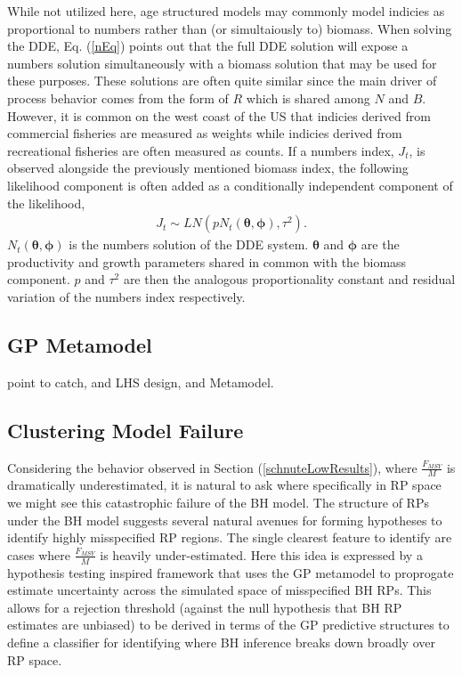 %
While not utilized here, age structured models may commonly model
indicies as proportional to numbers rather than (or simultaiously to)
biomass. When solving the DDE, Eq. (\ref{nEq}) points out that the full DDE
solution will expose a numbers solution simultaneously with a biomass solution
that may be used for these purposes. These solutions are often quite similar
since the main driver of process behavior comes from the form of $R$ which is
shared among $N$ and $B$.
However, it is common on the west coast of the US that indicies derived from commercial
fisheries are measured as weights %
while indicies derived from recreational fisheries are often measured as counts.
If a numbers index, $J_t$, is observed alongside the previously
mentioned biomass index, the following likelihood component is often added as a
conditionally independent component of the likelihood, %
\begin{align}
J_t \sim LN(p N_t(\bm{\theta}, \bm{\phi}), \tau^{2}) \label{nL}.
\end{align}
%
$N_t(\bm{\theta}, \bm{\phi})$ is the numbers solution of the DDE system.
$\bm{\theta}$ and $\bm{\phi}$ are the productivity and growth parameters shared in 
common with the biomass component. $p$ and $\tau^2$ are then the analogous
proportionality constant and residual variation of the numbers index respectively.

%
\subsection{GP Metamodel}

%
{\color{red}
point to catch, and LHS design, and Metamodel.
}

%
\subsection{Clustering Model Failure}

%
Considering the behavior observed in Section (\ref{schnuteLowResults}), where
$\frac{F_{MSY}}{M}$ is dramatically underestimated, it is natural to ask
where specifically in RP space we might see this catastrophic failure of the
BH model.
%
The structure of RPs under the BH model suggests several natural avenues for
forming hypotheses to identify highly misspecified RP regions. The single
clearest feature to identify are cases where $\frac{F_{MSY}}{M}$ is
heavily under-estimated. Here this idea is expressed by a hypothesis testing
inspired framework that uses the GP metamodel to proprogate estimate
uncertainty across the simulated space of misspecified BH RPs.
This allows for a rejection threshold (against the null hypothesis that BH RP
estimates are unbiased) to be derived in terms of the GP predictive structures
to define a classifier for identifying where BH inference breaks down
broadly over RP space.


